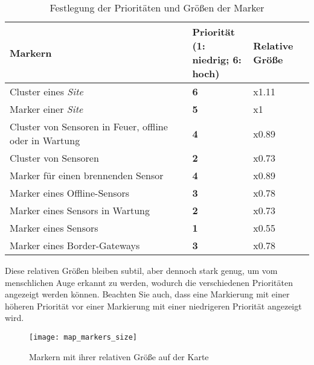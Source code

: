 \begin{table}[H]
  \begin{tabular}{p{0.6\linewidth} |p{0.2\linewidth}|p{0.2\linewidth}}
    Markern                                                & Priorität (1: niedrig; 6: hoch) & Relative Größe \\ \hline\hline

    Cluster eines \textit{Site}                            & \textbf{6}                      & x1.11          \\\hline
    Marker einer \textit{Site}                             & \textbf{5}                      & x1             \\\hline
    Cluster von Sensoren in Feuer, offline oder in Wartung & \textbf{4}                      & x0.89          \\\hline
    Cluster von Sensoren                                   & \textbf{2}                      & x0.73          \\\hline
    Marker für einen brennenden Sensor                     & \textbf{4}                      & x0.89          \\\hline
    Marker eines Offline-Sensors                           & \textbf{3}                      & x0.78          \\\hline
    Marker eines Sensors in Wartung                        & \textbf{2}                      & x0.73          \\\hline
    Marker eines Sensors                                   & \textbf{1}                      & x0.55          \\\hline
    Marker eines Border-Gateways                           & \textbf{3}                      & x0.78
  \end{tabular}
  \caption{Festlegung der Prioritäten und Größen der Marker}
\end{table}

Diese relativen Größen bleiben subtil, aber dennoch stark genug, um vom menschlichen Auge erkannt zu werden, wodurch die verschiedenen Prioritäten angezeigt werden können.
Beachten Sie auch, dass eine Markierung mit einer höheren Priorität vor einer Markierung mit einer niedrigeren Priorität angezeigt wird.

\begin{figure}[H]
  \centering
  \texttt{[image: map\_markers\_size]}
  \caption{Markern mit ihrer relativen Größe auf der Karte}
  \label{fig:map_markers_size}
\end{figure}


